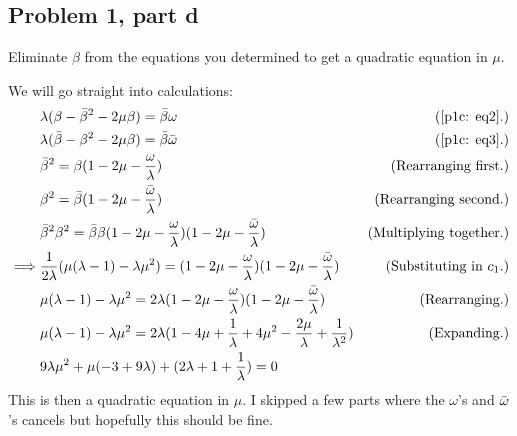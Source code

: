 \subsection{Problem 1, part d}
Eliminate $\beta$ from the equations you determined to get a quadratic equation in $\mu$.
\partbreak
\begin{solution}
    
    We will go straight into calculations:
    \alignbreak
    \begin{align*}
        &\lambda(\beta - \Bar{\beta}^2 - 2\mu\beta) = \Bar{\beta}\omega &\text{(\ref{p1c: eq2}.)}\\
        &\lambda(\Bar{\beta} - \beta^2 - 2\mu\beta) = \Bar{\beta}\Bar{\omega} &\text{(\ref{p1c: eq3}.)}\\
        &\Bar{\beta}^2 = \beta(1 - 2\mu - \frac{\omega}{\lambda}) &\text{(Rearranging first.)}\\
        &\beta^2 = \Bar{\beta}(1 - 2\mu - \frac{\Bar{\omega}}{\lambda}) &\text{(Rearranging second.)}\\
        &\Bar{\beta}^2\beta^2 = \Bar{\beta}\beta(1 - 2\mu -\frac{\omega}{\lambda}) (1 - 2\mu -\frac{\Bar{\omega}}{\lambda}) &\text{(Multiplying together.)}\\
        \implies &\frac{1}{2\lambda}(\mu(\lambda - 1) - \lambda \mu^2) = (1 - 2\mu -\frac{\omega}{\lambda}) (1 - 2\mu -\frac{\Bar{\omega}}{\lambda}) &\text{(Substituting in $c_1$.)}\\
        &\mu(\lambda - 1) - \lambda \mu^2 = 2\lambda(1 - 2\mu -\frac{\omega}{\lambda}) (1 - 2\mu -\frac{\Bar{\omega}}{\lambda}) &\text{(Rearranging.)}\\
        &\mu(\lambda - 1) - \lambda \mu^2 = 2\lambda(1 - 4\mu + \frac{1}{\lambda} +4\mu^2 - \frac{2\mu}{\lambda} + \frac{1}{\lambda^2} )&\text{(Expanding.)}\\
        &9\lambda\mu^2 + \mu(-3 + 9\lambda) + (2\lambda +1 +\frac{1}{\lambda}) = 0
    \end{align*}
    \alignbreak
    This is then a quadratic equation in $\mu$. I skipped a few parts where the $\omega$'s and $\Bar{\omega}$'s cancels but hopefully this should be fine.
\end{solution}

\newpage
